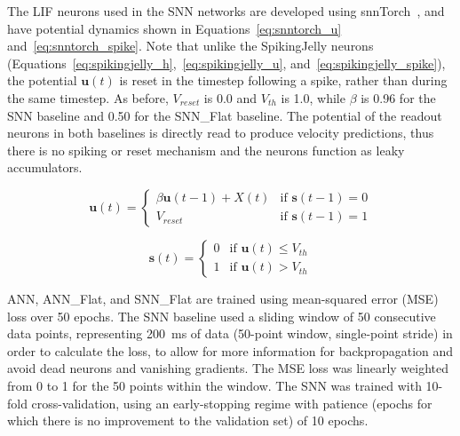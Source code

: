 The LIF neurons used in the SNN networks are developed using snnTorch~\cite{eshraghian2021training}, and have potential dynamics shown in Equations~\ref{eq:snntorch_u} and~\ref{eq:snntorch_spike}. Note that unlike the SpikingJelly neurons (Equations~\ref{eq:spikingjelly_h},~\ref{eq:spikingjelly_u}, and~\ref{eq:spikingjelly_spike}), the potential $\mathbf{u}(t)$ is reset in the timestep following a spike, rather than during the same timestep. As before, $V_{reset}$ is 0.0 and $V_{th}$ is 1.0, while $\beta$ is 0.96 for the SNN baseline and 0.50 for the SNN\_Flat baseline. The potential of the readout neurons in both baselines is directly read to produce velocity predictions, thus there is no spiking or reset mechanism and the neurons function as leaky accumulators.

\begin{equation}
    \mathbf{u}(t) = 
    \begin{cases}
        \beta \mathbf{u}(t-1) + X(t) & \text{if } \mathbf{s}(t-1) = 0 \\
        V_{reset} & \text{if } \mathbf{s}(t-1) = 1
    \end{cases}
    \label{eq:snntorch_u}
\end{equation}

\begin{equation}
    \mathbf{s}(t) = 
    \begin{cases}
        0 & \text{if } \mathbf{u}(t) \leq V_{th} \\
        1 & \text{if } \mathbf{u}(t) > V_{th}
    \end{cases}
    \label{eq:snntorch_spike}
\end{equation}

ANN, ANN\_Flat, and SNN\_Flat are trained using mean-squared error (MSE) loss over 50 epochs. The SNN baseline used a sliding window of 50 consecutive data points, representing 200~ms of data (50-point window, single-point stride) in order to calculate the loss, to allow for more information for backpropagation and avoid dead neurons and vanishing gradients. The MSE loss was linearly weighted from 0 to 1 for the 50 points within the window. The SNN was trained with 10-fold cross-validation, using an early-stopping regime with patience (epochs for which there is no improvement to the validation set) of 10 epochs. 




